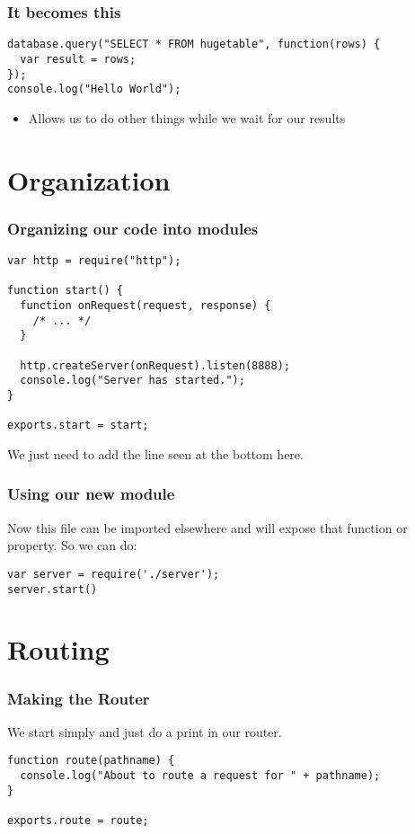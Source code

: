 \documentclass[ignorenonframetext,]{beamer}
\begin{document}
\begin{frame}[fragile]\frametitle{It becomes this}

\begin{verbatim}
database.query("SELECT * FROM hugetable", function(rows) {
  var result = rows;
});
console.log("Hello World");
\end{verbatim}
\begin{itemize}
\item
  Allows us to do other things while we wait for our results
\end{itemize}
\end{frame}

\section{Organization}

\begin{frame}[fragile]\frametitle{Organizing our code into modules}

\begin{verbatim}
var http = require("http");

function start() {
  function onRequest(request, response) {
    /* ... */
  }

  http.createServer(onRequest).listen(8888);
  console.log("Server has started.");
}

exports.start = start;
\end{verbatim}
We just need to add the line seen at the bottom here.

\end{frame}

\begin{frame}[fragile]\frametitle{Using our new module}

Now this file can be imported elsewhere and will expose that function or
property. So we can do:

\begin{verbatim}
var server = require('./server');
server.start()
\end{verbatim}
\end{frame}

\section{Routing}

\begin{frame}[fragile]\frametitle{Making the Router}

We start simply and just do a print in our router.

\begin{verbatim}
function route(pathname) {
  console.log("About to route a request for " + pathname);
}

exports.route = route; 
\end{verbatim}
\end{frame}
\end{document}
